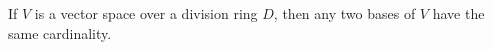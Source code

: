 If $V$ is a vector space over a division ring $D$, then any two bases of $V$ have the same cardinality.

